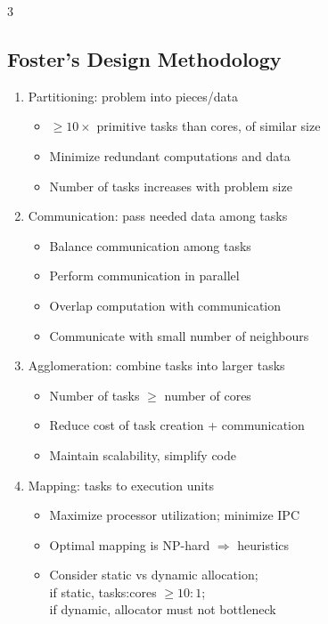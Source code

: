 \documentclass[12pt, a4paper]{article}
\begin{document}
\begin{multicols*}{3}
\subsection{Foster's Design Methodology}
\begin{enumerate}[\roman*.]
  \item Partitioning: problem into pieces/data 
    \begin{itemize}[leftmargin=*]\vspace{2pt}
      \item $\geq 10\times$ primitive tasks than cores, of similar size
      \item Minimize redundant computations and data
      \item Number of tasks increases with problem size
    \end{itemize}
  \item Communication: pass needed data among tasks 
    \begin{itemize}[leftmargin=*]\vspace{2pt}
      \item Balance communication among tasks
      \item Perform communication in parallel 
      \item Overlap computation with communication
      \item Communicate with small number of neighbours
    \end{itemize}
  \item Agglomeration: combine tasks into larger tasks 
    \begin{itemize}[leftmargin=*]\vspace{2pt}
      \item Number of tasks $\geq$ number of cores
      \item Reduce cost of task creation + communication
      \item Maintain scalability, simplify code
    \end{itemize}
  \item Mapping: tasks to execution units
    \begin{itemize}[leftmargin=*]\vspace{2pt}
      \item Maximize processor utilization; minimize IPC
      \item Optimal mapping is NP-hard $\Rightarrow$ heuristics 
      \item Consider static vs dynamic allocation;\\if static, tasks:cores $\ge 10{:}1$;\\if dynamic, allocator must not bottleneck
    \end{itemize}
\end{enumerate}


\end{multicols*}
\end{document}
